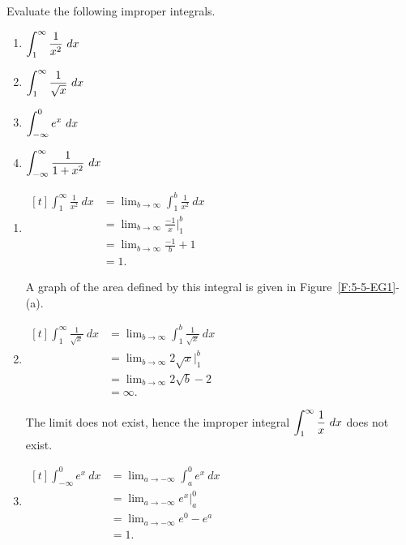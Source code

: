\begin{example} \label{eg:5.5.1} %
Evaluate the following improper integrals.

\bmtwo
\begin{enumerate}[1)]
\item		$\ds\int_1^\infty \frac1{x^2}\ dx$
\item		$\ds\int_1^\infty \frac1{\sqrt{x}}\ dx$
\item		$\ds\int_{-\infty}^0 e^x\ dx$
\item		$\displaystyle\int_{-\infty}^\infty \frac1{1+x^2}\ dx$
\end{enumerate}
\emtwo


\solution
\begin{enumerate}[1)]
\item	$\begin{aligned}[t] 
\int_1^\infty \frac{1}{x^2}\ dx &= \lim_{b\to\infty} \int_1^b\frac1{x^2}\ dx \\ 
&= \lim_{b\to\infty} \frac{-1}{x}\Big|_1^b \\
&= \lim_{b\to\infty} \frac{-1}{b} + 1\\
&= 1.
\end{aligned}$

A graph of the area defined by this integral is given in Figure~\ref{F:5-5-EG1}-(a).
 
\item $\begin{aligned}[t]
\int_1^\infty \frac1{\sqrt{x}}\ dx & = \lim_{b\to\infty}\int_1^b\frac1{\sqrt{x}}\ dx \\
&= \lim_{b\to\infty} 2\sqrt{x}\Big|_1^b \\
&= \lim_{b\to\infty} 2\sqrt{b}-2 \\
&= \infty.
\end{aligned}$
	
The limit does not exist, hence the improper integral $\displaystyle\int_1^\infty\frac1x\ dx$ does not exist. %

\item $\begin{aligned}[t]
\int_{-\infty}^0 e^x \ dx &= \lim_{a\to-\infty} \int_a^0e^x\ dx \\
&=  \lim_{a\to-\infty} e^x\Big|_a^0 \\
&= \lim_{a\to-\infty} e^0-e^a \\
&= 1.
\end{aligned}$
		

\end{enumerate}
\end{example}
